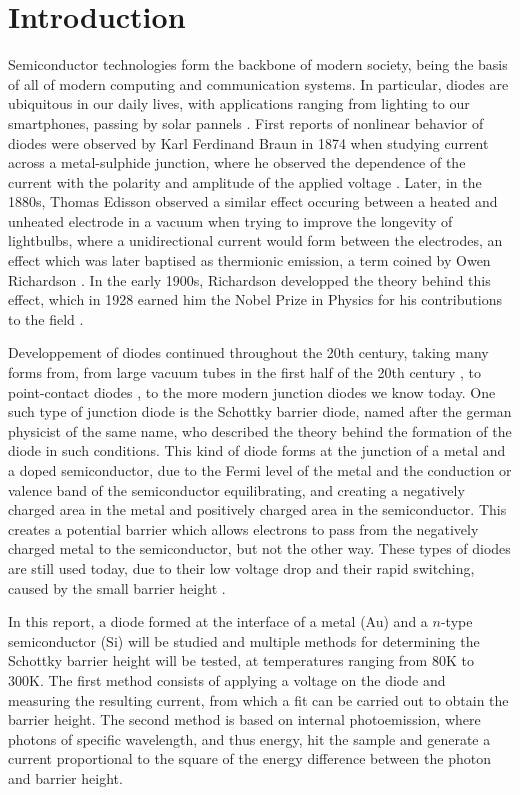 \section{Introduction}
Semiconductor technologies form the backbone of modern society, being the basis of all of modern computing and communication systems.
In particular, diodes are ubiquitous in our daily lives, with applications ranging from lighting to our smartphones, passing by solar pannels \cite{notice}. 
First reports of nonlinear behavior of diodes were observed by Karl Ferdinand Braun in 1874 when studying current across a metal-sulphide junction, where he observed the dependence of the current with the polarity and amplitude of the applied voltage \cite{braun_ueber_1875}.
Later, in the 1880s, Thomas Edisson observed a similar effect occuring between a heated and unheated electrode in a vacuum when trying to improve the longevity of lightbulbs, where a unidirectional current would form between the electrodes, an effect which was later baptised as thermionic emission, a term coined by Owen Richardson \cite{da_rosa_chapter_2022}.
In the early 1900s, Richardson developped the theory behind this effect, which in 1928 earned him the Nobel Prize in Physics for his contributions to the field \cite{da_rosa_chapter_2022}.

Developpement of diodes continued throughout the 20th century, taking many forms from, from large vacuum tubes in the first half of the 20th century \cite{bernardo_revision_2024}, to point-contact diodes \cite{bernardo_revision_2024}, to the more modern junction diodes we know today.
One such type of junction diode is the Schottky barrier diode, named after the german physicist of the same name, who described the theory behind the formation of the diode in such conditions.
This kind of diode forms at the junction of a metal and a doped semiconductor, due to the Fermi level of the metal and the conduction or valence band of the semiconductor equilibrating, and creating a negatively charged area in the metal and positively charged area in the semiconductor.
This creates a potential barrier which allows electrons to pass from the negatively charged metal to the semiconductor, but not the other way.
These types of diodes are still used today, due to their low voltage drop and their rapid switching, caused by the small barrier height \cite{kent_walters_introduction_1997}.

In this report, a diode formed at the interface of a metal (Au) and a $n$-type semiconductor (Si) will be studied and multiple methods for determining the Schottky barrier height will be tested, at temperatures ranging from 80K to 300K. The first method consists of applying a voltage on the diode and measuring the resulting current, from which a fit can be carried out to obtain the barrier height. The second method is based on internal photoemission, where photons of specific wavelength, and thus energy, hit the sample and generate a current proportional to the square of the energy difference between the photon and barrier height.
